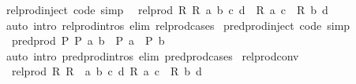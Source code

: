 \begin{isabellebody}
\isanewline
{}\isamarkupfalse%
\ rel{\isacharunderscore}{\kern0pt}prod{\isacharunderscore}{\kern0pt}inject\ {\isacharbrackleft}{\kern0pt}code{\isacharcomma}{\kern0pt}\ simp{\isacharbrackright}{\kern0pt}{\isacharcolon}{\kern0pt}\isanewline
\ \ {\isachardoublequoteopen}rel{\isacharunderscore}{\kern0pt}prod\ R{}\ R{}\ {\isacharparenleft}{\kern0pt}a{\isacharcomma}{\kern0pt}\ b{\isacharparenright}{\kern0pt}\ {\isacharparenleft}{\kern0pt}c{\isacharcomma}{\kern0pt}\ d{\isacharparenright}{\kern0pt}\ {\isasymlongleftrightarrow}\ R{}\ a\ c\ {\isasymand}\ R{}\ b\ d{\isachardoublequoteclose}\isanewline
%
\isadelimproof
\ \ %
\endisadelimproof
%
\isatagproof
{}\isamarkupfalse%
\ {\isacharparenleft}{\kern0pt}auto\ intro{\isacharcolon}{\kern0pt}\ rel{\isacharunderscore}{\kern0pt}prod{\isachardot}{\kern0pt}intros\ elim{\isacharcolon}{\kern0pt}\ rel{\isacharunderscore}{\kern0pt}prod{\isachardot}{\kern0pt}cases{\isacharparenright}{\kern0pt}%
\endisatagproof
{\isafoldproof}%
%
\isadelimproof
\isanewline
%
\endisadelimproof
\isanewline
{}\isamarkupfalse%
\ pred{\isacharunderscore}{\kern0pt}prod{\isacharunderscore}{\kern0pt}inject\ {\isacharbrackleft}{\kern0pt}code{\isacharcomma}{\kern0pt}\ simp{\isacharbrackright}{\kern0pt}{\isacharcolon}{\kern0pt}\isanewline
\ \ {\isachardoublequoteopen}pred{\isacharunderscore}{\kern0pt}prod\ P{}\ P{}\ {\isacharparenleft}{\kern0pt}a{\isacharcomma}{\kern0pt}\ b{\isacharparenright}{\kern0pt}\ {\isasymlongleftrightarrow}\ P{}\ a\ {\isasymand}\ P{}\ b{\isachardoublequoteclose}\isanewline
%
\isadelimproof
\ \ %
\endisadelimproof
%
\isatagproof
{}\isamarkupfalse%
\ {\isacharparenleft}{\kern0pt}auto\ intro{\isacharcolon}{\kern0pt}\ pred{\isacharunderscore}{\kern0pt}prod{\isachardot}{\kern0pt}intros\ elim{\isacharcolon}{\kern0pt}\ pred{\isacharunderscore}{\kern0pt}prod{\isachardot}{\kern0pt}cases{\isacharparenright}{\kern0pt}%
\endisatagproof
{\isafoldproof}%
%
\isadelimproof
\isanewline
%
\endisadelimproof
\isanewline
{}\isamarkupfalse%
\ rel{\isacharunderscore}{\kern0pt}prod{\isacharunderscore}{\kern0pt}conv{\isacharcolon}{\kern0pt}\isanewline
\ \ {\isachardoublequoteopen}rel{\isacharunderscore}{\kern0pt}prod\ R{}\ R{}\ {\isacharequal}{\kern0pt}\ {\isacharparenleft}{\kern0pt}{\isasymlambda}{\isacharparenleft}{\kern0pt}a{\isacharcomma}{\kern0pt}\ b{\isacharparenright}{\kern0pt}\ {\isacharparenleft}{\kern0pt}c{\isacharcomma}{\kern0pt}\ d{\isacharparenright}{\kern0pt}{\isachardot}{\kern0pt}\ R{}\ a\ c\ {\isasymand}\ R{}\ b\ d{\isacharparenright}{\kern0pt}{\isachardoublequoteclose}\isanewline

\end{isabellebody}
